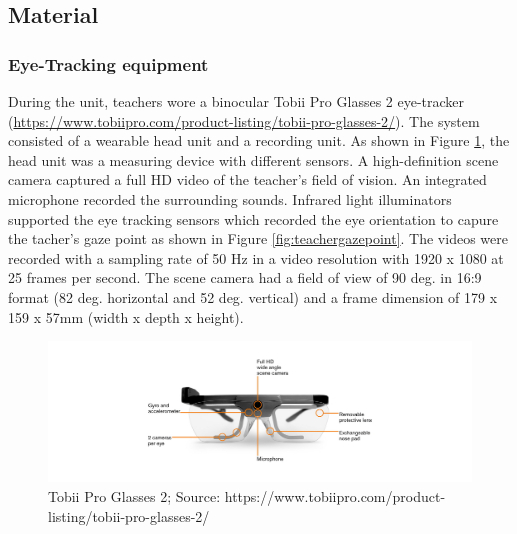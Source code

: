 \documentclass[
  man,floatsintext]{apa6}
\begin{document}
\hypertarget{material}{%
\subsection{Material}\label{material}}

\hypertarget{eye-tracking-equipment}{%
\subsubsection{Eye-Tracking equipment}\label{eye-tracking-equipment}}

During the unit, teachers wore a binocular Tobii Pro Glasses 2 eye-tracker (\url{https://www.tobiipro.com/product-listing/tobii-pro-glasses-2/}). The system consisted of a wearable head unit and a recording unit. As shown in Figure \ref{fig:tobiiglasses2}, the head unit was a measuring device with different sensors. A high-definition scene camera captured a full HD video of the teacher's field of vision. An integrated microphone recorded the surrounding sounds. Infrared light illuminators supported the eye tracking sensors which recorded the eye orientation to capure the tacher's gaze point as shown in Figure \ref{fig:teachergazepoint}. The videos were recorded with a sampling rate of 50 Hz in a video resolution with 1920 x 1080 at 25 frames per second. The scene camera had a field of view of 90 deg. in 16:9 format (82 deg. horizontal and 52 deg. vertical) and a frame dimension of 179 x 159 x 57mm (width x depth x height).

\begin{figure}

{\centering \includegraphics{./pictures/tobiiglasses2} 

}

\caption{Tobii Pro Glasses 2; Source: https://www.tobiipro.com/product-listing/tobii-pro-glasses-2/}\label{fig:tobiiglasses2}
\end{figure}
\end{document}
